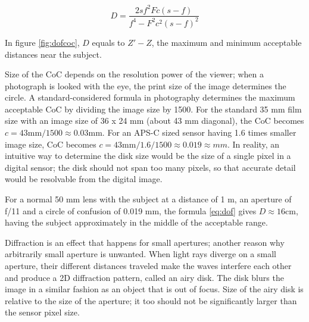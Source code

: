 \begin{equation} \label{eq:dof}
	D = \frac{2 s f^2 F c (s - f)} {f^4 - F^2 c^2 (s - f)^2}
\end{equation}

In figure \ref{fig:dofcoc}, $D$ equals to $Z' - Z$, the maximum and minimum acceptable distances near the subject.

Size of the CoC depends on the resolution power of the viewer; when a photograph is looked with the eye, the print size of the image determines the circle.
A standard-considered formula in photography determines the maximum acceptable CoC by dividing the image size by 1500.
For the standard 35 mm film size with an image size of 36 x 24 mm (about 43 mm diagonal), the CoC becomes $c = 43 \text{mm} / 1500 \approx 0.03 \text{mm}$.
For an APS-C sized sensor having 1.6 times smaller image size, CoC becomes $c = 43 \text{mm} / 1.6 / 1500 \approx 0.019 \approx{mm}$.
In reality, an intuitive way to determine the disk size would be the size of a single pixel in a digital sensor;
the disk should not span too many pixels, so that accurate detail would be resolvable from the digital image.

For a normal 50 mm lens with the subject at a distance of 1 m, an aperture of f/11 and a circle of confusion of 0.019 mm, the formula \ref{eq:dof} gives $D \approx 16 \text{cm}$, having the subject approximately in the middle of the acceptable range.




Diffraction is an effect that happens for small apertures; another reason why arbitrarily small aperture is unwanted.
When light rays diverge on a small aperture, their different distances traveled make the waves interfere each other and produce a 2D diffraction pattern, called an airy disk.
The disk blurs the image in a similar fashion as an object that is out of focus.
Size of the airy disk is relative to the size of the aperture; it too should not be significantly larger than the sensor pixel size.

